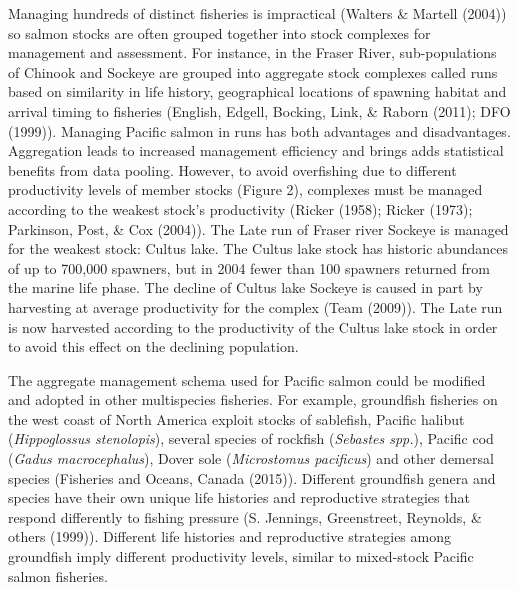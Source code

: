 \documentclass[12pt,]{scrartcl}
\begin{document}
Managing hundreds of distinct fisheries is impractical (Walters \&
Martell (2004)) so salmon stocks are often grouped together into stock
complexes for management and assessment. For instance, in the Fraser
River, sub-populations of Chinook and Sockeye are grouped into aggregate
stock complexes called runs based on similarity in life history,
geographical locations of spawning habitat and arrival timing to
fisheries (English, Edgell, Bocking, Link, \& Raborn (2011); DFO
(1999)). Managing Pacific salmon in runs has both advantages and
disadvantages. Aggregation leads to increased management efficiency and
brings adds statistical benefits from data pooling. However, to avoid
overfishing due to different productivity levels of member stocks
(Figure 2), complexes must be managed according to the weakest stock's
productivity (Ricker (1958); Ricker (1973); Parkinson, Post, \& Cox
(2004)). The Late run of Fraser river Sockeye is managed for the weakest
stock: Cultus lake. The Cultus lake stock has historic abundances of up
to 700,000 spawners, but in 2004 fewer than 100 spawners returned from
the marine life phase. The decline of Cultus lake Sockeye is caused in
part by harvesting at average productivity for the complex (Team
(2009)). The Late run is now harvested according to the productivity of
the Cultus lake stock in order to avoid this effect on the declining
population.

The aggregate management schema used for Pacific salmon could be
modified and adopted in other multispecies fisheries. For example,
groundfish fisheries on the west coast of North America exploit stocks
of sablefish, Pacific halibut (\emph{Hippoglossus stenolopis}), several
species of rockfish (\emph{Sebastes spp.}), Pacific cod (\emph{Gadus
macrocephalus}), Dover sole (\emph{Microstomus pacificus}) and other
demersal species (Fisheries and Oceans, Canada (2015)). Different
groundfish genera and species have their own unique life histories and
reproductive strategies that respond differently to fishing pressure (S.
Jennings, Greenstreet, Reynolds, \& others (1999)). Different life
histories and reproductive strategies among groundfish imply different
productivity levels, similar to mixed-stock Pacific salmon fisheries.
\end{document}
